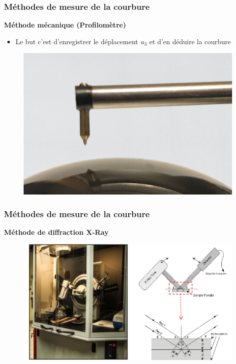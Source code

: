 \begin{frame}
    \frametitle{Méthodes de mesure de la courbure}
    \textbf{\Large{Méthode mécanique (Profilomètre)}}
    \begin{itemize}
        \item Le but c'est d'enregistrer le déplacement $u_3$ et d'en déduire la courbure
    \end{itemize}
    \begin{figure}
        \centering
        \includegraphics[scale=0.2]{imgs/Digital_Metrology-Measuring_Arcs_with_Stylus_1_Stylus_on_Ball-1024x695.png}
    \end{figure}
\end{frame}

\begin{frame}
    \frametitle{Méthodes de mesure de la courbure}
    \textbf{\Large{Méthode de diffraction X-Ray}}
    \begin{figure}
        \centering
        \includegraphics[scale=0.3]{imgs/XRD-equipment-and-schematic-of-X-ray-diffraction-adopted-from-Erdem-2012-Nelson-2015.png}
    \end{figure}
\end{frame}


